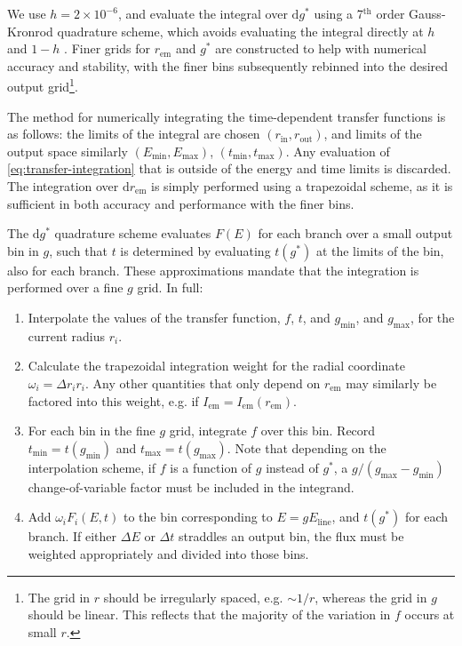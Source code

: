\documentclass[fleqn,usenatbib]{mnras}
\renewcommand{\d}{\text{d}}
\begin{document}
We use $h = 2 \times 10^{-6}$, and evaluate the integral over $\d g^\ast$ using a 7$^\text{th}$ order Gauss-Kronrod quadrature scheme, which avoids evaluating the integral directly at $h$ and $1 - h$ \citep{}. Finer grids for $r_\text{em}$ and $g^\ast$ are constructed to help with numerical accuracy and stability, with the finer bins subsequently rebinned into the desired output grid\footnote{The grid in $r$ should be irregularly spaced, e.g. $\sim 1 / r$, whereas the grid in $g$ should be linear. This reflects that the majority of the variation in $f$ occurs at small $r$.}.

The method for numerically integrating the time-dependent transfer functions is as follows: the limits of the integral are chosen $(r_\text{in}, r_\text{out})$, and limits of the output space similarly $(E_\text{min}, E_\text{max})$, $(t_\text{min}, t_\text{max})$. Any evaluation of \eqref{eq:transfer-integration} that is outside of the energy and time limits is discarded.  The integration over $\d r_\text{em}$ is simply performed using a trapezoidal scheme, as it is sufficient in both accuracy and performance with the finer bins. 

The $\d g^\ast$ quadrature scheme evaluates $F(E)$ for each branch over a small output bin in $g$, such that $t$ is determined by evaluating $t(g^\ast)$ at the limits of the bin, also for each branch. These approximations mandate that the integration is performed over a fine $g$ grid. In full:
\begin{enumerate}
    \item Interpolate the values of the transfer function, $f$, $t$, and $g_\text{min}$, and $g_\text{max}$, for the current radius $r_i$.
    \item Calculate the trapezoidal integration weight for the radial coordinate $\omega_i = \Delta r_i r_i$. Any other quantities that only depend on $r_\text{em}$ may similarly be factored into this weight, e.g. if $I_\text{em} = I_\text{em}(r_\text{em})$.
    \item For each bin in the fine $g$ grid, integrate $f$ over this bin. Record $t_\text{min} = t(g_\text{min})$ and $t_\text{max} = t(g_\text{max})$. Note that depending on the interpolation scheme, if $f$ is a function of $g$ instead of $g^\ast$, a $g / (g_\text{max} - g_\text{min})$ change-of-variable factor must be included in the integrand.
    \item Add $\omega_i F_i(E, t)$ to the bin corresponding to $E = gE_\text{line}$, and $t(g^\ast)$ for each branch. If either $\Delta E$ or $\Delta t$ straddles an output bin, the flux must be weighted appropriately and divided into those bins.
\end{enumerate}
\end{document}
